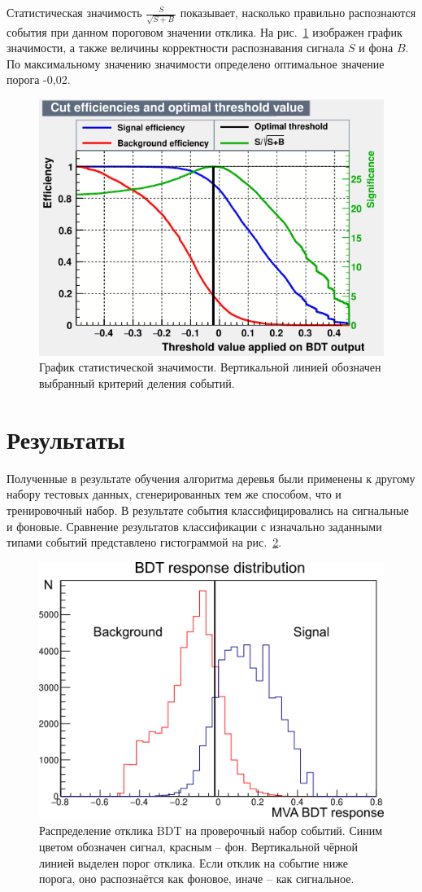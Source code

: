 \documentclass[14pt]{extarticle}
\begin{document}
Статистическая значимость $\frac{S}{\sqrt{S+B}}$ показывает, насколько правильно распознаются события при данном пороговом значении отклика. На рис.~\ref{fig:significance} изображен график значимости, а также величины корректности распознавания сигнала $S$ и фона $B$. По максимальному значению значимости определено оптимальное значение порога -0,02.

\begin{figure}[h!]
	\centering
	\includegraphics[width=0.7\linewidth]{../pics/significance.png}
	\caption{График статистической значимости. Вертикальной линией обозначен выбранный критерий деления событий.}
	\label{fig:significance}
\end{figure}

\section{Результаты}

Полученные в результате обучения алгоритма деревья были применены к другому набору тестовых данных, сгенерированных тем же способом, что и тренировочный набор. В результате события классифицировались на сигнальные и фоновые. Сравнение результатов классификации с изначально заданными типами событий представлено гистограммой на рис.~\ref{fig:verification}.

\begin{figure}[h!]
	\centering
	\includegraphics[width=0.7\linewidth]{../pics/verification2.png}
	\caption{Распределение отклика BDT на проверочный набор событий. Синим цветом обозначен сигнал, красным -- фон. Вертикальной чёрной линией выделен порог отклика. Если отклик на событие ниже порога, оно распознаётся как фоновое, иначе -- как сигнальное.}
	\label{fig:verification}
\end{figure}
\end{document}
